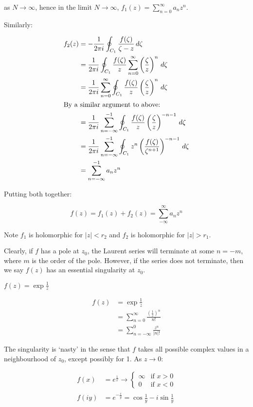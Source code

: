 \documentclass{physics_notes}
\begin{document}
as $N\to \infty$, hence in the limit $N\to\infty$, $f_1(z) = \sum_{n=0}^\infty a_n z^n$.

Similarly:

\begin{align*}
f_2 (z) &= -\frac{1}{2\pi i} \oint_{C_1} \frac{f(\zeta)}{\zeta - z} \, d\zeta \\
&= \frac{1}{2\pi i} \oint_{C_1} \frac{f(\zeta)}{z} \sum_{n=0}^\infty \left(\frac{\zeta}{z}\right)^n \, d\zeta \\
&= \frac{1}{2\pi i} \sum_{n=0}^\infty \oint_{C_1} \frac{f(\zeta)}{z} \left(\frac{\zeta}{z}\right)^n \, d\zeta \\
\intertext{By a similar argument to above:}
&= \frac{1}{2\pi i} \sum_{n=-\infty}^{-1} \oint_{C_1} \frac{f(\zeta)}{z} \left(\frac{\zeta}{z}\right)^{-n-1} \, d\zeta \\
&= \frac{1}{2\pi i} \sum_{n=-\infty}^{-1} \oint_{C_1} z^n \left(\frac{f(\zeta)}{\zeta^{n+1}}\right)^{-n-1} \, d\zeta \\
&= \sum_{n=-\infty}^{-1} a_n z^n
\end{align*}

Putting both together:

\[ f(z) = f_1 (z) + f_2 (z) = \sum_{-\infty}^{\infty} a_n z^n \]

Note $f_1$ is holomorphic for $|z| < r_2$ and $f_2$ is holomorphic for $|z|>r_1$.

Clearly, if $f$ has a pole at $z_0$, the Laurent series will terminate at some $n = -m$, where $m$ is the order of the pole. However, if the series does not terminate, then we say $f(z)$ has an essential singularity at $z_0$.

\begin{example}{$f(z) = \exp{\frac{1}{z}}$}

\begin{align*}
f(z) &= \exp{\frac{1}{z}} \\
&= \sum_{n=0}^\infty \frac{\left(\frac{1}{z}\right)^n}{n!} \\
&= \sum_{n=-\infty}^0 \frac{z^n}{|n|!}
\end{align*}

The singularity is `nasty' in the sense that $f$ takes all possible complex values in a neighbourhood of $z_0$, except possibly for 1. As $z\to 0$:

\begin{align*}
f(x) &= e^{\frac{1}{x}} \to \begin{cases} \infty & \mbox{if } x>0 \\
0 & \mbox{if } x<0 \end{cases} \\
f(iy) &= e^{-\frac{i}{y}} = \cos{\frac{1}{y}} - i\sin{\frac{1}{y}}
\end{align*}
\end{example}
\end{document}
